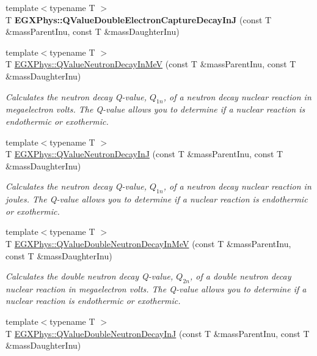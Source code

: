 \begin{DoxyCompactItemize}
\item 
\mbox{\label{group___q_value_gae25e179b76580bc6af7fa4bdf938ba4e}} 
{\footnotesize template$<$typename T $>$ }\\T {\bfseries E\+G\+X\+Phys\+::\+Q\+Value\+Double\+Electron\+Capture\+Decay\+InJ} (const T \&mass\+Parent\+Inu, const T \&mass\+Daughter\+Inu)
\item 
{\footnotesize template$<$typename T $>$ }\\T \hyperlink{group___q_value_gaf854b3ac07909a87f44be4e38ebb0c32}{E\+G\+X\+Phys\+::\+Q\+Value\+Neutron\+Decay\+In\+MeV} (const T \&mass\+Parent\+Inu, const T \&mass\+Daughter\+Inu)
\begin{DoxyCompactList}\small\item\em Calculates the neutron decay Q-\/value, $Q_{1n}$, of a neutron decay nuclear reaction in megaelectron volts. The Q-\/value allows you to determine if a nuclear reaction is endothermic or exothermic. \end{DoxyCompactList}\item 
{\footnotesize template$<$typename T $>$ }\\T \hyperlink{group___q_value_gab9ffbd12c3f814e03f0ed1fbdcba0700}{E\+G\+X\+Phys\+::\+Q\+Value\+Neutron\+Decay\+InJ} (const T \&mass\+Parent\+Inu, const T \&mass\+Daughter\+Inu)
\begin{DoxyCompactList}\small\item\em Calculates the neutron decay Q-\/value, $Q_{1n}$, of a neutron decay nuclear reaction in joules. The Q-\/value allows you to determine if a nuclear reaction is endothermic or exothermic. \end{DoxyCompactList}\item 
{\footnotesize template$<$typename T $>$ }\\T \hyperlink{group___q_value_ga6bfea723aca78b32ea67cc1ca7b4031b}{E\+G\+X\+Phys\+::\+Q\+Value\+Double\+Neutron\+Decay\+In\+MeV} (const T \&mass\+Parent\+Inu, const T \&mass\+Daughter\+Inu)
\begin{DoxyCompactList}\small\item\em Calculates the double neutron decay Q-\/value, $Q_{2n}$, of a double neutron decay nuclear reaction in megaelectron volts. The Q-\/value allows you to determine if a nuclear reaction is endothermic or exothermic. \end{DoxyCompactList}\item 
{\footnotesize template$<$typename T $>$ }\\T \hyperlink{group___q_value_gada1ace2aa0a791df382f120767a56fe9}{E\+G\+X\+Phys\+::\+Q\+Value\+Double\+Neutron\+Decay\+InJ} (const T \&mass\+Parent\+Inu, const T \&mass\+Daughter\+Inu)

\end{DoxyCompactItemize}
